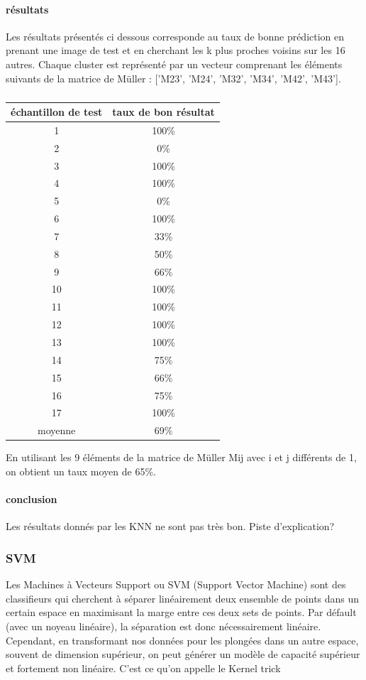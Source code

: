 \documentclass[a4paper,10pt]{report}
\begin{document}
\paragraph{résultats}
Les résultats présentés ci dessous corresponde au taux de bonne prédiction en prenant une image de test et en cherchant les k plus proches voisins sur les 16 autres. Chaque cluster est représenté par un vecteur comprenant les éléments suivants de la matrice de Müller : ['M23', 'M24', 'M32', 'M34', 'M42', 'M43'].
\subparagraph{}
\begin{center}
\begin{tabular}{|c|c|}  
  \hline
  échantillon de test & taux de bon résultat \\
  \hline
  1 & 100\%\\
  2 & 0\%\\
  3 & 100\%\\
  4 & 100\%\\
  5 & 0\%\\
  6  & 100\%\\
  7 & 33\%\\  
  8 & 50\%\\
  9 & 66\%\\
  10 & 100\%\\
  11 & 100\%\\
  12 & 100\%\\
  13 & 100\%\\
  14 & 75\%\\
  15 & 66\%\\
  16 & 75\%\\
  17 & 100\%\\
  \hline
  moyenne & 69\%\\  
  \hline
\end{tabular}
\end{center}

En utilisant les 9 éléments de la matrice de Müller Mij avec i et j différents de 1, on obtient un taux moyen de 65\%.
\paragraph{conclusion}
Les résultats donnés par les KNN ne sont pas très bon. Piste d'explication?

\subsubsection{SVM}
Les Machines à Vecteurs Support ou SVM (Support Vector Machine) sont des classifieurs qui cherchent à séparer linéairement deux ensemble de points dans un certain espace en maximisant la marge entre ces deux sets de points. Par défault (avec un noyeau linéaire), la séparation est donc nécessairement linéaire. Cependant, en transformant nos données pour les plongées dans un autre espace, souvent de dimension supérieur, on peut générer un modèle de capacité supérieur et fortement non linéaire. C'est ce qu'on appelle le Kernel trick
\end{document}
